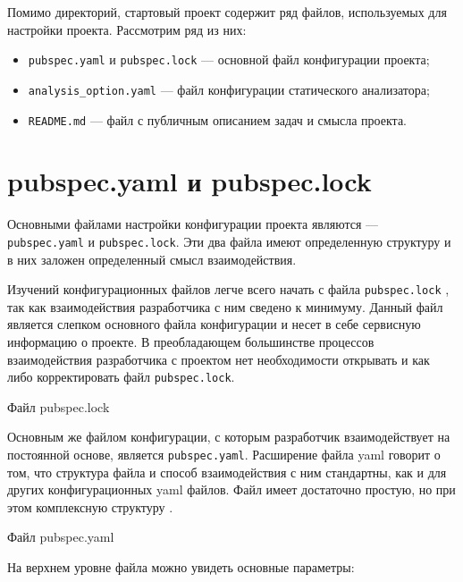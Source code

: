 Помимо директорий, стартовый проект содержит ряд файлов,
используемых для настройки проекта. Рассмотрим ряд из них:

\begin{itemize}
	\item \texttt{pubspec.yaml} и \texttt{pubspec.lock} --- основной файл
		конфигурации проекта;
	\item \texttt{analysis\_option.yaml} --- файл конфигурации
		статического анализатора;
	\item \texttt{README.md} --- файл с публичным описанием задач
		и смысла проекта.
\end{itemize}

\section{pubspec.yaml и pubspec.lock}

Основными файлами настройки конфигурации проекта являются ---
\texttt{pubspec.yaml} и \texttt{pubspec.lock}.
Эти два файла имеют определенную структуру
и в них заложен определенный смысл взаимодействия.\par
Изучений конфигурационных файлов легче всего начать
с файла \texttt{pubspec.lock} ,
так как взаимодействия разработчика с ним сведено к минимуму.
Данный файл является слепком основного файла конфигурации
и несет в себе сервисную информацию о проекте.
В преобладающем большинстве процессов взаимодействия разработчика
с проектом нет необходимости открывать
и как либо корректировать файл \texttt{pubspec.lock}.

\begin{image}
	\caption{Файл pubspec.lock}
	\label{fig:pubspec:lock}
\end{image}

Основным же файлом конфигурации,
с которым разработчик взаимодействует на постоянной основе,
является \texttt{pubspec.yaml}. Расширение файла yaml говорит о том,
что структура файла и способ взаимодействия с ним стандартны,
как и для других конфигурационных yaml файлов. Файл имеет достаточно простую,
но при этом комплексную структуру .

\begin{image}
	\caption{Файл pubspec.yaml}
	\label{fig:pubspec:yaml}
\end{image}

На верхнем уровне файла можно увидеть основные параметры:

